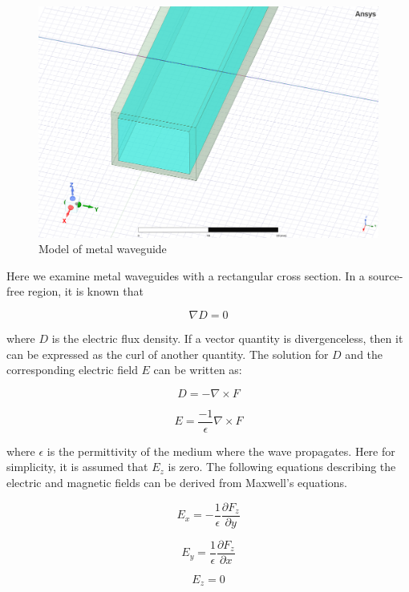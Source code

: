 \documentclass[a4paper,12pt]{report}
\begin{document}
\begin{figure}
  \begin{center}
    \includegraphics[clip, keepaspectratio, width=0.5\linewidth]{img/metal_waveguide.png}
    \caption{Model of metal waveguide}
    \label{fig:metal_waveguide}
  \end{center}
\end{figure}

Here we examine metal waveguides with a rectangular cross section.
In a source-free region, it is known that

\begin{equation}
  \nabla D = 0
\end{equation}

where $D$ is the electric flux density.
If a vector quantity is divergenceless,
then it can be expressed as the curl of another quantity.
The solution for $D$ and the corresponding electric field $E$
can be written as:

\begin{equation}
  D = -\nabla \times F
\end{equation}

\begin{equation}
  E = \frac{-1}{\epsilon}\nabla \times F
\end{equation}

where $\epsilon$ is the permittivity of the medium where the wave propagates.
Here for simplicity, it is assumed that $E_z$ is zero.
The following equations describing the electric and magnetic fields can be derived from Maxwell's equations.

\begin{equation}
  E_x = -\frac{1}{\epsilon}\frac{\partial F_z}{\partial y}
\end{equation}

\begin{equation}
  E_y = \frac{1}{\epsilon}\frac{\partial F_z}{\partial x}
\end{equation}

\begin{equation}
  E_z = 0
\end{equation}
\end{document}
